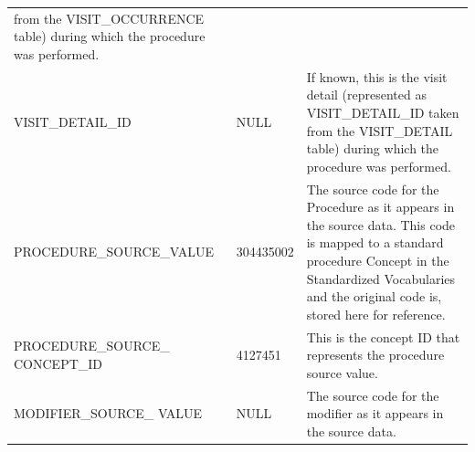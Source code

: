 \documentclass[]{book}
\begin{document}
\begin{longtable}[]{@{}lll@{}}
\begin{minipage}[t]{0.47\columnwidth}
from the VISIT\_OCCURRENCE table) during which the procedure was
performed.\strut
\end{minipage}\tabularnewline
\begin{minipage}[t]{0.30\columnwidth}\raggedright\strut
VISIT\_DETAIL\_ID\strut
\end{minipage} & \begin{minipage}[t]{0.14\columnwidth}\raggedright\strut
NULL\strut
\end{minipage} & \begin{minipage}[t]{0.47\columnwidth}\raggedright\strut
If known, this is the visit detail (represented as VISIT\_DETAIL\_ID
taken from the VISIT\_DETAIL table) during which the procedure was
performed.\strut
\end{minipage}\tabularnewline
\begin{minipage}[t]{0.30\columnwidth}\raggedright\strut
PROCEDURE\_SOURCE\_VALUE\strut
\end{minipage} & \begin{minipage}[t]{0.14\columnwidth}\raggedright\strut
304435002\strut
\end{minipage} & \begin{minipage}[t]{0.47\columnwidth}\raggedright\strut
The source code for the Procedure as it appears in the source data. This
code is mapped to a standard procedure Concept in the Standardized
Vocabularies and the original code is, stored here for reference.\strut
\end{minipage}\tabularnewline
\begin{minipage}[t]{0.30\columnwidth}\raggedright\strut
PROCEDURE\_SOURCE\_ CONCEPT\_ID\strut
\end{minipage} & \begin{minipage}[t]{0.14\columnwidth}\raggedright\strut
4127451\strut
\end{minipage} & \begin{minipage}[t]{0.47\columnwidth}\raggedright\strut
This is the concept ID that represents the procedure source value.\strut
\end{minipage}\tabularnewline
\begin{minipage}[t]{0.30\columnwidth}\raggedright\strut
MODIFIER\_SOURCE\_ VALUE\strut
\end{minipage} & \begin{minipage}[t]{0.14\columnwidth}\raggedright\strut
NULL\strut
\end{minipage} & \begin{minipage}[t]{0.47\columnwidth}\raggedright\strut
The source code for the modifier as it appears in the source data.\strut
\end{minipage}\tabularnewline
\bottomrule
\end{longtable}
\end{document}
